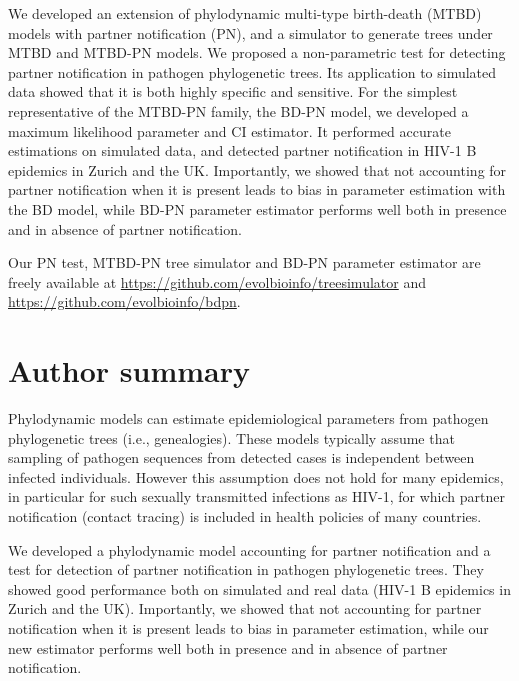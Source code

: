 \documentclass[10pt,letterpaper]{article}
\begin{document}
We developed an extension of phylodynamic multi-type birth-death (MTBD) models with partner notification (PN), and a simulator to generate trees under MTBD and MTBD-PN models. We proposed a non-parametric test for detecting partner notification in pathogen phylogenetic trees. Its application to simulated data showed that it is both highly specific and sensitive. For the simplest representative of the MTBD-PN family, the BD-PN model, we developed a maximum likelihood parameter and CI estimator. It performed accurate estimations on simulated data, and detected partner notification in HIV-1 B epidemics in Zurich and the UK. Importantly, we showed that not accounting for partner notification when it is present leads to bias in parameter estimation with the BD model, while BD-PN parameter estimator performs well both in presence and in absence of partner notification.

Our PN test, MTBD-PN tree simulator and BD-PN parameter estimator are freely available at \href{github.com/evolbioinfo/treesimulator}{https://github.com/evolbioinfo/treesimulator} and \href{github.com/evolbioinfo/bdpn}{https://github.com/evolbioinfo/bdpn}.


\section*{Author summary}
Phylodynamic models can estimate epidemiological parameters from pathogen phylogenetic trees (i.e., genealogies). These models typically assume that sampling of pathogen sequences from detected cases is independent between infected individuals. However this assumption does not hold for many epidemics, in particular for such sexually transmitted infections as HIV-1, for which partner notification (contact tracing) is included in health policies of many countries. 

We developed a phylodynamic model accounting for partner notification and a test for detection of partner notification in pathogen phylogenetic trees. They showed good performance both on simulated and real data (HIV-1 B epidemics in Zurich and the UK). Importantly, we showed that not accounting for partner notification when it is present leads to bias in parameter estimation, while our new estimator performs well both in presence and in absence of partner notification.
\end{document}
